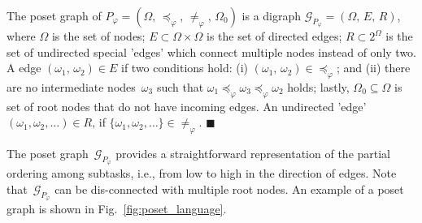 \begin{definition}
The poset graph of $P_{\varphi}=(\Omega,\,\preceq_{\varphi},\,\neq_{\varphi},
\,\Omega_0)$ is a digraph $\mathcal{G}_{P_\varphi}=(\Omega,\,E,\,R)$,
where $\Omega$ is the set of nodes;
$E\subset \Omega \times \Omega$ is the set of directed edges;
$R\subset 2^\Omega$ is the set of undirected special 'edges' which 
connect multiple nodes instead of only two.
A edge $(\omega_1,\,\omega_2)\in E$ if two conditions hold:
(i) $(\omega_1,\, \omega_2)\in \preceq_{\varphi}$;
{and} (ii) there are no intermediate nodes~$\omega_3$ such that
$\omega_1\preceq_{\varphi} \omega_3 \preceq_{\varphi} \omega_2$ holds;
lastly, $\Omega_0\subseteq \Omega$ is set of root nodes that do not have
incoming edges. An undirected 'edge' $(\omega_1,\omega_2,\dots)\in R$, if $\{\omega_1,\omega_2,\dots\}\in \neq_{\varphi}$.
\hfill $\blacksquare$
 \end{definition}

The poset graph~$\mathcal{G}_{P_\varphi}$ provides a straightforward
representation of the partial ordering among subtasks,
i.e., from low to high in the direction of edges.
Note that~$\mathcal{G}_{P_\varphi}$ can be dis-connected with multiple root nodes.
An example of a poset graph is shown in Fig.~\ref{fig:poset_language}.

